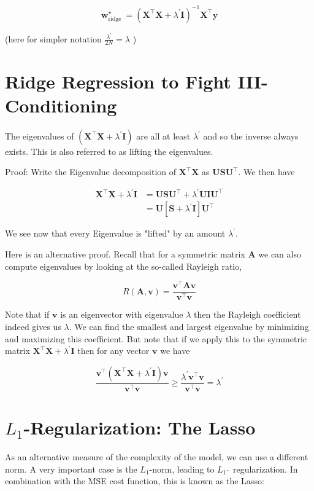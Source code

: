 \documentclass[10pt]{article}
\begin{document}
$$
\mathbf{w}_{\text {ridge }}^{\star}=\left(\mathbf{X}^{\top} \mathbf{X}+\lambda^{\prime} \mathbf{I}\right)^{-1} \mathbf{X}^{\top} \mathbf{y}
$$

(here for simpler notation $\frac{\lambda^{\prime}}{2 N}=\lambda$ )

\section*{Ridge Regression to Fight III-Conditioning}
The eigenvalues of $\left(\mathbf{X}^{\top} \mathbf{X}+\lambda^{\prime} \mathbf{I}\right)$ are all at least $\lambda^{\prime}$ and so the inverse always exists. This is also referred to as lifting the eigenvalues.

Proof: Write the Eigenvalue decomposition of $\mathbf{X}^{\top} \mathbf{X}$ as $\mathbf{U S U}^{\top}$. We then have

$$
\begin{aligned}
\mathbf{X}^{\top} \mathbf{X}+\lambda^{\prime} \mathbf{I} & =\mathbf{U S} \mathbf{U}^{\top}+\lambda^{\prime} \mathbf{U I U}^{\top} \\
& =\mathbf{U}\left[\mathbf{S}+\lambda^{\prime} \mathbf{I}\right] \mathbf{U}^{\top}
\end{aligned}
$$

We see now that every Eigenvalue is "lifted" by an amount $\lambda^{\prime}$.

Here is an alternative proof. Recall that for a symmetric matrix $\mathbf{A}$ we can also compute eigenvalues by looking at the so-called Rayleigh ratio,

$$
R(\mathbf{A}, \mathbf{v})=\frac{\mathbf{v}^{\top} \mathbf{A} \mathbf{v}}{\mathbf{v}^{\top} \mathbf{v}}
$$

Note that if $\mathbf{v}$ is an eigenvector with eigenvalue $\lambda$ then the Rayleigh coefficient indeed gives us $\lambda$. We can find the smallest and largest eigenvalue by minimizing and maximizing this coefficient. But note that if we apply this to the symmetric matrix $\mathbf{X}^{\top} \mathbf{X}+\lambda^{\prime} \mathbf{I}$ then for any vector $\mathbf{v}$ we have

$$
\frac{\mathbf{v}^{\top}\left(\mathbf{X}^{\top} \mathbf{X}+\lambda^{\prime} \mathbf{I}\right) \mathbf{v}}{\mathbf{v}^{\top} \mathbf{v}} \geq \frac{\lambda^{\prime} \mathbf{v}^{\top} \mathbf{v}}{\mathbf{v}^{\top} \mathbf{v}}=\lambda^{\prime}
$$

\section*{$L_{1}$-Regularization: The Lasso}
As an alternative measure of the complexity of the model, we can use a different norm. A very important case is the $L_{1}$-norm, leading to $L_{1^{-}}$ regularization. In combination with the MSE cost function, this is known as the Lasso:
\end{document}
